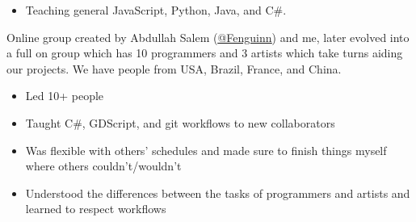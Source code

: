 \documentclass[10pt,a4paper,ragged2e,withhyper]{altacv}
\begin{document}
	\begin{paracol}{2}
		
		
		\divider
		
		
		
		\begin{itemize}
			\item Teaching general JavaScript, Python, Java, and C\#.
		\end{itemize}
		
		\divider
		
		
		Online group created by Abdullah Salem (\href{https://github.com/Fenguinn}{\uline{@Fenguinn}}) and me, later evolved into a full on group which has 10 programmers and 3 artists which take turns aiding our projects. We have people from USA, Brazil, France, and China.
		
		\medskip
		
		\begin{itemize}
			\item Led 10+ people
			\item Taught C\#, GDScript, and git workflows to new collaborators
			\item Was flexible with others’ schedules and made sure to finish things myself where others couldn’t/wouldn’t
			\item Understood the differences between the tasks of programmers and artists and learned to respect workflows
		\end{itemize}
		
		\divider
		
		
		

\end{paracol}
\end{document}
